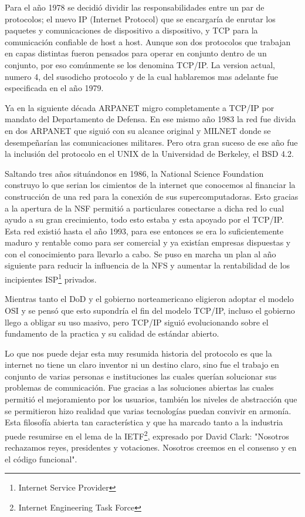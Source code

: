 \documentclass[11pt,a4paper]{article}
\begin{document}
Para el año 1978 se decidió dividir las responsabilidades entre un par de protocolos; el nuevo IP
(Internet Protocol) que se encargaría de enrutar los paquetes y comunicaciones de dispositivo a 
dispositivo, y TCP para la comunicación confiable de host a host. Aunque son dos protocolos que 
trabajan en capas distintas fueron pensados para operar en conjunto dentro de un conjunto, por eso
comúnmente se los denomina TCP/IP. La version actual, numero 4, del susodicho protocolo y de la cual
hablaremos mas adelante fue especificada en el año 1979.\par
Ya en la siguiente década ARPANET migro completamente a TCP/IP por mandato del Departamento de 
Defensa. En ese mismo año 1983 la red fue divida en dos ARPANET que siguió con su alcance original y
MILNET donde se desempeñarían las comunicaciones militares. Pero otra gran suceso de ese año fue la
inclusión del protocolo en el UNIX de la Universidad de Berkeley, el BSD 4.2.\par
Saltando tres años situándonos en 1986, la National Science Foundation construyo lo que serian los
cimientos de la internet que conocemos al financiar la construcción de una red para la conexión de
sus supercomputadoras. Esto gracias a la apertura de la NSF permitió a particulares conectarse a 
dicha red lo cual ayudo a su gran crecimiento, todo esto estaba y esta apoyado por el TCP/IP. Esta 
red existió hasta el año 1993, para ese entonces se era lo suficientemente maduro y rentable como 
para ser comercial y ya existían empresas dispuestas y con el conocimiento para llevarlo a cabo. Se 
puso en marcha un plan al año siguiente para reducir la influencia de la NFS y aumentar la 
rentabilidad de los incipientes ISP\footnote{Internet Service Provider} privados.\par
Mientras tanto el DoD y el gobierno norteamericano eligieron adoptar el modelo OSI y se pensó que
esto supondría el fin del modelo TCP/IP, incluso el gobierno llego a obligar su uso masivo, pero
TCP/IP siguió evolucionando sobre el fundamento de la practica y su calidad de estándar abierto.\par
Lo que nos puede dejar esta muy resumida historia del protocolo es que la internet no tiene un claro
inventor ni un destino claro, sino fue el trabajo en conjunto de varias personas e instituciones las
cuales querían solucionar sus problemas de comunicación. Fue gracias a las soluciones abiertas las
cuales permitió el mejoramiento por los usuarios, también los niveles de abstracción que se 
permitieron hizo realidad que varias tecnologías puedan convivir en armonía. Esta filosofía abierta
tan característica y que ha marcado tanto a la industria puede resumirse en el lema de la 
IETF\footnote{Internet Engineering Task Force}, expresado por David Clark: "Nosotros rechazamos 
reyes, presidentes y votaciones. Nosotros creemos en el consenso y en el código funcional".
\end{document}
